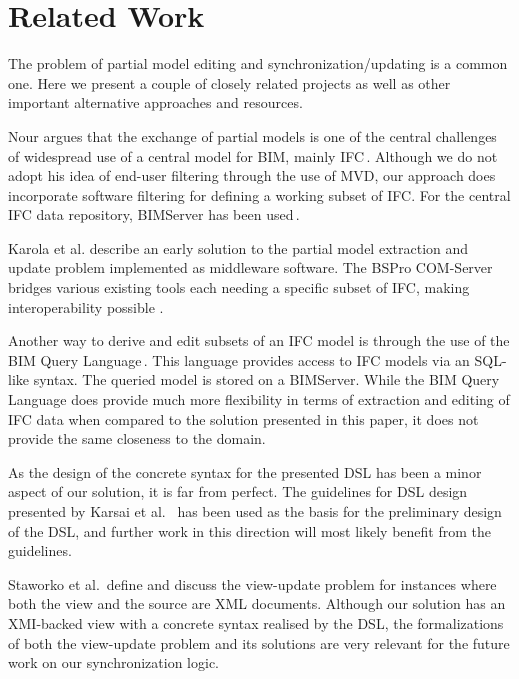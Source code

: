 \section{Related Work}
The problem of partial model editing and synchronization/updating is a common one. Here we present a couple of closely related projects as well as other important alternative approaches and resources.

Nour argues that the exchange of partial models is one of the central challenges of widespread use of a central model for BIM, mainly IFC\,\cite{nour08}. Although we do not adopt his idea of end-user filtering through the use of MVD, our approach does incorporate software filtering for defining a working subset of IFC. For the central IFC data repository, BIMServer has been used\,\cite{beetz10}.

Karola et al. describe an early solution to the partial model extraction and update problem implemented as middleware software. The BSPro COM-Server bridges various existing tools each needing a specific subset of IFC, making interoperability possible \cite{karola02}.

Another way to derive and edit subsets of an IFC model is through the use of the BIM Query Language\,\cite{mazairac10}. This language provides access to IFC models via an SQL-like syntax. The queried model is stored on a BIMServer. While the BIM Query Language does provide much more flexibility in terms of extraction and editing of IFC data when compared to the solution presented in this paper, it does not provide the same closeness to the domain.

As the design of the concrete syntax for the presented DSL has been a minor aspect of our solution, it is far from perfect. The guidelines for DSL design presented by Karsai et al. \,\cite{karsai09} has been used as the basis for the preliminary design of the DSL, and further work in this direction will most likely benefit from the guidelines.

Staworko et al.\,\cite{staworko10} define and discuss the view-update problem for instances where both the view and the source are XML documents. Although our solution has an XMI-backed view with a concrete syntax realised by the DSL, the formalizations of both the view-update problem and its solutions are very relevant for the future work on our synchronization logic.

